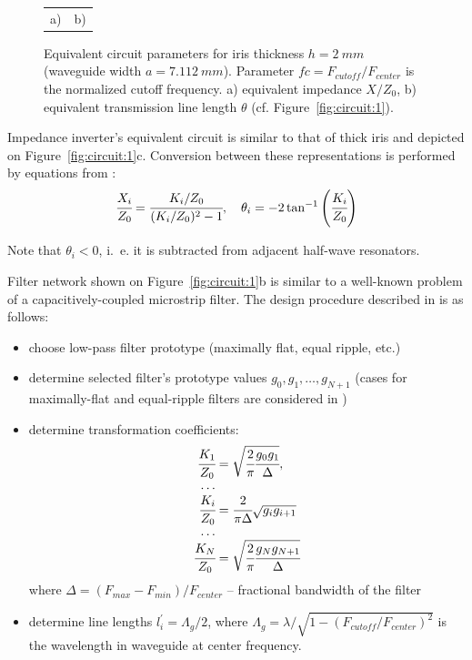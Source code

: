 \documentclass{pj}
\begin{document}
\begin{figure}[h]
\begin{tabular}{cc}
    \\
    a) & b) \\
  \end{tabular}
  \caption{Equivalent circuit parameters for iris thickness $h = 2~mm$
    (waveguide width $a = 7.112~mm$). Parameter
    $fc = F_{cutoff}/F_{center}$ is the normalized cutoff
    frequency. a) equivalent impedance $X/Z_0$, b) equivalent
    transmission line length $\theta$
    (cf. Figure~\ref{fig:circuit:1}).}
  \label{fig:equiv-circuit}
\end{figure}


Impedance inverter's equivalent circuit is similar to that of thick
iris and depicted on Figure~\ref{fig:circuit:1}c. Conversion between
these representations is performed by equations from \cite{pozar2012microwave}:
\begin{equation}
  \label{eq:impedance_transformer}
  \cfrac{X_i}{Z_0} = \cfrac{K_i/Z_0}{(K_i/Z_0)^2-1},
  \quad
  \theta_i = - 2 \tan^{-1}{\left(\cfrac{K_i}{Z_0}\right)}
\end{equation}

Note that $\theta_i < 0$, i.~e. it is subtracted from adjacent half-wave
resonators.

Filter network shown on Figure~\ref{fig:circuit:1}b is similar to a
well-known problem of a capacitively-coupled microstrip filter. The
design procedure described in \cite{pozar2012microwave} is as follows:
\begin{itemize}
\item choose low-pass filter prototype (maximally flat, equal ripple, etc.)
\item determine selected filter's prototype values
  $g_0, g_1, \dots, g_{N+1}$ (cases for maximally-flat and
  equal-ripple filters are considered in \cite{matthaei1980})
\item determine transformation coefficients:
  \begin{equation}
    \begin{array}{r@{}l}
      \cfrac{K_1}{Z_0} &{}= \sqrt{\cfrac{2}{\pi} \cfrac{g_0g_1}{\Delta}}, \\
      \dots \\
      \cfrac{K_i}{Z_0} &{}= \cfrac{2}{\pi \Delta}\sqrt{g_i g_{i+1}} \\
      \dots \\
      \cfrac{K_N}{Z_0} &{}= \sqrt{\cfrac{2}{\pi} \cfrac{g_N g_{N+1}}{\Delta}}
    \end{array}
    \label{eq:trans_coeff}    
  \end{equation}
  where $\Delta = (F_{max}-F_{min})/F_{center}$ -- fractional
  bandwidth of the filter
\item determine line lengths $l^{\prime}_i = \Lambda_g/2$, where
  $\Lambda_g = \lambda / \sqrt{1-(F_{cutoff}/F_{center})^2}$ is the
  wavelength in waveguide at center frequency.
\end{itemize}
\end{document}
